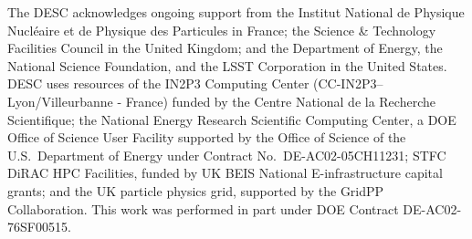 The DESC acknowledges ongoing support from the Institut National de 
Physique Nucl\'eaire et de Physique des Particules in France; the 
Science \& Technology Facilities Council in the United Kingdom; and the
Department of Energy, the National Science Foundation, and the LSST 
Corporation in the United States.  DESC uses resources of the IN2P3 
Computing Center (CC-IN2P3--Lyon/Villeurbanne - France) funded by the 
Centre National de la Recherche Scientifique; the National Energy 
Research Scientific Computing Center, a DOE Office of Science User 
Facility supported by the Office of Science of the U.S.\ Department of
Energy under Contract No.\ DE-AC02-05CH11231; STFC DiRAC HPC Facilities, 
funded by UK BEIS National E-infrastructure capital grants; and the UK 
particle physics grid, supported by the GridPP Collaboration.  This 
work was performed in part under DOE Contract DE-AC02-76SF00515.
